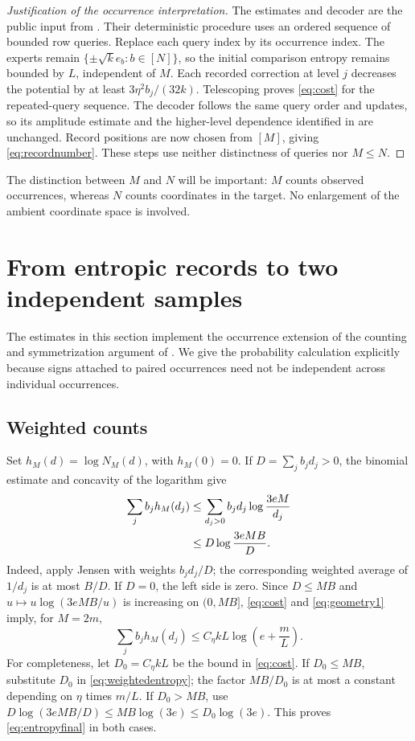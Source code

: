 \documentclass[11pt]{article}
\theoremstyle{remark}
\newcommand{\1}{\mathbf 1}
\begin{document}
\begin{proof}[Justification of the occurrence interpretation]
The estimates and decoder are the public input from
\cite[Lemmas 2.2 and 3.1, Proposition 3.2, and Lemmas 4.1--4.2 and
6.1]{BIK}.
Their deterministic procedure uses an ordered sequence of bounded row
queries. Replace each query index by its occurrence index. The experts
remain $\{\pm\sqrt{k}e_b:b\in[N]\}$, so the initial comparison entropy
remains bounded by $L$, independent of $M$. Each recorded correction at
level $j$ decreases the potential by at least $3\eta^2b_j/(32k)$.
Telescoping proves \eqref{eq:cost} for the repeated-query sequence.
The decoder follows the same query order and updates, so its amplitude
estimate and the higher-level dependence identified in
\cite[Lemma 6.1]{BIK} are unchanged. Record positions
are now chosen from $[M]$, giving \eqref{eq:recordnumber}. These steps
use neither distinctness of queries nor $M\leq N$.
\end{proof}

The distinction between $M$ and $N$ will be important: $M$ counts
observed occurrences, whereas $N$ counts coordinates in the target.
No enlargement of the ambient coordinate space is involved.

\section{From entropic records to two independent samples}

The estimates in this section implement the occurrence extension of the
counting and symmetrization argument of \cite[Sections 5--8]{BIK}.
We give the probability calculation explicitly because signs attached
to paired occurrences need not be independent across individual
occurrences.

\subsection{Weighted counts}

Set $h_M(d)=\log N_M(d)$, with $h_M(0)=0$. If
$D=\sum_j b_jd_j>0$, the binomial estimate and concavity of the logarithm
give
\begin{align}
 \sum_j b_jh_M(d_j)
 &\leq\sum_{d_j>0}b_jd_j\log\frac{3eM}{d_j}\notag\\
 &\leq D\log\frac{3eM B}{D}.\label{eq:weightedentropy}
\end{align}
Indeed, apply Jensen with weights $b_jd_j/D$; the corresponding weighted
average of $1/d_j$ is at most $B/D$. If $D=0$, the left side is zero.
Since $D\leq MB$ and $u\mapsto u\log(3eMB/u)$ is increasing on
$(0,MB]$, \eqref{eq:cost} and \eqref{eq:geometry1} imply, for $M=2m$,
\begin{equation}\label{eq:entropyfinal}
 \sum_j b_jh_M(d_j)
 \leq C_\eta kL\log\left(e+\frac mL\right).
\end{equation}
For completeness, let $D_0=C_\eta kL$ be the bound in
\eqref{eq:cost}. If $D_0\leq MB$, substitute $D_0$ in
\eqref{eq:weightedentropy}; the factor $MB/D_0$ is at most a constant
depending on $\eta$ times $m/L$. If $D_0>MB$, use
$D\log(3eMB/D)\leq MB\log(3e)\leq D_0\log(3e)$.
This proves \eqref{eq:entropyfinal} in both cases.
\end{document}
